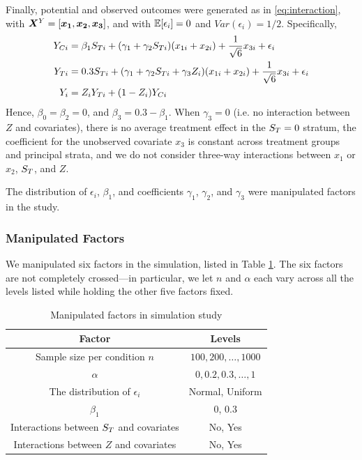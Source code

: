\documentclass[11pt]{article} %
\begin{document}
Finally, potential and observed outcomes were generated as in \eqref{eq:interaction}, with $\bm{X}^Y=[\bm{x_1},\bm{x_2},\bm{x_3}]$,
and with $\mathbb{E}[\epsilon_i]=0$ and $Var(\epsilon_i)=1/2$.
Specifically,
\begin{equation}\label{eq:y-sim}
  \begin{split}
  Y_{Ci}&=\beta_1S_{Ti}+(\gamma_1+\gamma_2S_{Ti})(x_{1i}+x_{2i})+\frac{1}{\sqrt{6}}x_{3i}+\epsilon_i\\
  Y_{Ti}&=0.3S_{Ti}+(\gamma_1+\gamma_2S_{Ti}+\gamma_3Z_i)(x_{1i}+x_{2i})+\frac{1}{\sqrt{6}}x_{3i}+\epsilon_i\\
  Y_i&=Z_iY_{Ti}+(1-Z_i)Y_{Ci}
  \end{split}
\end{equation}
Hence, $\beta_0=\beta_2=0$, and $\beta_3=0.3-\beta_1$. When $\gamma_3=0$ (i.e. no interaction between $Z$ and covariates), there is no average treatment effect in the $S_T=0$ stratum, the coefficient for the unobserved covariate $x_3$ is constant across treatment groups and principal strata, and we do not consider three-way interactions between $x_1$ or $x_2$, $S_T$, and $Z$.

The distribution of $\epsilon_i$, $\beta_1$, and coefficients $\gamma_1$, $\gamma_2$, and $\gamma_3$ were manipulated factors in the study.


\subsubsection{Manipulated Factors}
We manipulated six factors in the simulation, listed in Table \ref{tab:factor}.
The six factors are not completely crossed---in particular, we let $n$ and $\alpha$ each vary across all the levels listed while holding the other five factors fixed.

\begin{table}
  \centering
  \begin{tabular}{cc}
    \hline
    Factor &Levels\\
    \hline
Sample size per condition $n$ &$100,200,\dots,1000$\\
$\alpha$ &$0,0.2,0.3,\dots,1$\\
The distribution of $\epsilon_i$& Normal, Uniform\\
$\beta_1$ & 0, 0.3\\
Interactions between $S_T$ and covariates & No, Yes\\
Interactions between $Z$ and covariates& No, Yes\\
\hline
  \end{tabular}
  \caption{Manipulated factors in simulation study}
  \label{tab:factor}
  \end{table}
\end{document}

